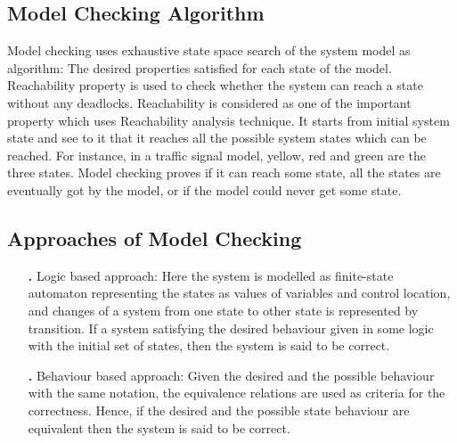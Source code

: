 \documentclass{article}
\begin{document}
\subsection{Model Checking Algorithm}
Model checking uses exhaustive state space search of the system model as 	algorithm: The desired properties satisfied for each state of the model. 	Reachability property is used to check whether the system can reach a state without any deadlocks. Reachability is considered as one of the important property which uses Reachability analysis technique. It starts from initial system state and see to it that it reaches all the possible system states which can be reached. For instance, in a traffic signal model, yellow, red and green are the three states. Model checking proves if it can reach some state, all the states are eventually got by the model, or if the model could never get some state.
\subsection{Approaches of Model Checking}
\begin{itemize}
\item[\textbf{.}] Logic based approach: Here the system is modelled as finite-state automaton representing the states as values of variables and control location, and changes of a system from one state to other state is represented by transition. If a system satisfying the desired behaviour given in some logic with the initial set of states, then the system is said to be correct.

\end{itemize}
\begin{itemize}
\item[\textbf{.}]	Behaviour based approach: Given the desired and the possible behaviour with the same notation, the equivalence relations are used as criteria for the correctness. Hence, if the desired and the possible state behaviour are equivalent then the system is said to be correct. 
\end{itemize} 
\end{document}
